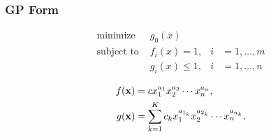 \documentclass{beamer}
\begin{document}
\begin{frame}
    \frametitle{GP Form}

        \begin{align*}
            \text{minimize } &g_0(x) \\
            \text{subject to } &f_i(x) = 1, &i &= 1,\dots,m\\
                               &g_i(x) \leq 1, &i &= 1,\dots,n
        \end{align*}

        \begin{align*}
            f(\bold{x}) &= c x_1^{a_1} x_2^{a_2} \dotsm x_n^{a_n} , \\
            g(\bold{x}) &= \displaystyle\sum_{k=1}^K c_k x_1^{a_{1_k}} x_2^{a_{2_k}} \dotsm x_n^{a_{n_k}}.
        \end{align*}

\end{frame}
\end{document}
